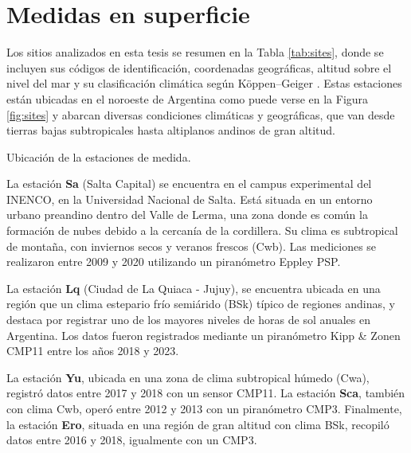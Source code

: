 \documentclass[letterpaper,12pt, twoside]{report}
\providecommand{\DIFdeltex}[1]{{\protect\color{red} \scriptsize #1}} %
\providecommand{\DIFdelFL}[1]{\DIFdel{#1}} %
\providecommand{\DIFdel}[1]{\texorpdfstring{\DIFdeltex{#1}}{}} %
\begin{document}
\section{\DIFdel{Medidas en superficie}}
\addtocounter{section}{-1}%

\DIFdel{Los sitios analizados en esta tesis se resumen en la Tabla \ref{tab:sites}, donde se incluyen sus códigos de identificación, coordenadas geográficas, altitud sobre el nivel del mar y su clasificación climática según Köppen–Geiger \citep{peel2007}. Estas estaciones  están ubicadas en el noroeste de Argentina como puede verse en la Figura \ref{fig:sites} y abarcan diversas condiciones climáticas y geográficas, que van desde tierras bajas subtropicales hasta altiplanos andinos de gran altitud.
}%

{%
\DIFdelFL{Ubicación de la estaciones de medida.}}

\DIFdel{La estación \textbf{Sa} (Salta Capital) se encuentra en el campus experimental del INENCO, en la Universidad Nacional de Salta. Está situada en un entorno urbano preandino dentro del Valle de Lerma, una zona donde es común la formación de nubes debido a la cercanía de la cordillera. Su clima es subtropical de montaña, con inviernos secos y veranos frescos (Cwb). Las mediciones se realizaron entre 2009 y 2020 utilizando un piranómetro Eppley PSP.
}%

\DIFdel{La estación \textbf{Lq} (Ciudad de La Quiaca - Jujuy), se encuentra ubicada en una región que un clima estepario frío semiárido (BSk) típico de regiones andinas, y destaca por registrar uno de los mayores niveles de horas de sol anuales en Argentina. Los datos fueron registrados mediante un piranómetro Kipp \& Zonen CMP11 entre los años 2018 y 2023.
}%

\DIFdel{La estación \textbf{Yu}, ubicada en una zona de clima subtropical húmedo (Cwa), registró datos entre 2017 y 2018 con un sensor CMP11. La estación \textbf{Sca}, también con clima Cwb, operó entre 2012 y 2013 con un piranómetro CMP3.	 Finalmente, la estación \textbf{Ero}, situada en una región de gran altitud con clima BSk, recopiló datos entre 2016 y 2018, igualmente con un CMP3.
}%
\end{document}
